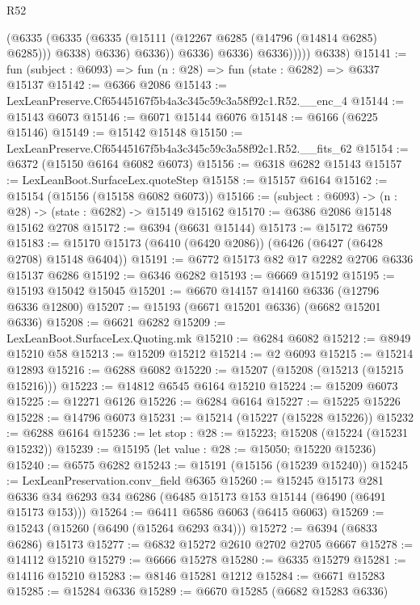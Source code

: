 \begin{lexlean}{R52}
\begin{coremodule}
                      (@6335
                        (@6335
                          (@6335 (@15111 (@12267 @6285 (@14796 (@14814 @6285) @6285))) @6338)
                          @6336)
                        @6336))
                    @6336)
                  @6336)
                @6336)))))
      @6338)
@15141 := fun (subject : @6093) => fun (n : @28) => fun (state : @6282) => @6337 @15137
@15142 := @6366 @2086
@15143 := LexLeanPreserve.Cf65445167f5b4a3c345c59c3a58f92c1.R52.__enc_4
@15144 := @15143 @6073
@15146 := @6071 @15144 @6076
@15148 := @6166 (@6225 @15146)
@15149 := @15142 @15148
@15150 := LexLeanPreserve.Cf65445167f5b4a3c345c59c3a58f92c1.R52.__fits_62
@15154 := @6372 (@15150 @6164 @6082 @6073)
@15156 := @6318 @6282 @15143
@15157 := LexLeanBoot.SurfaceLex.quoteStep
@15158 := @15157 @6164
@15162 := @15154 (@15156 (@15158 @6082 @6073))
@15166 := (subject : @6093) -> (n : @28) -> (state : @6282) -> @15149 @15162
@15170 := @6386 @2086 @15148 @15162 @2708
@15172 := @6394 (@6631 @15144)
@15173 := @15172 @6759
@15183 := @15170 @15173 (@6410 (@6420 @2086)) (@6426 (@6427 (@6428 @2708) @15148 @6404))
@15191 := @6772 @15173 @82 @17 @2282 @2706 @6336 @15137 @6286
@15192 := @6346 @6282
@15193 := @6669 @15192
@15195 := @15193 @15042 @15045
@15201 := @6670 @14157 @14160 @6336 (@12796 @6336 @12800)
@15207 := @15193 (@6671 @15201 @6336) (@6682 @15201 @6336)
@15208 := @6621 @6282
@15209 := LexLeanBoot.SurfaceLex.Quoting.mk
@15210 := @6284 @6082
@15212 := @8949 @15210 @58
@15213 := @15209 @15212
@15214 := @2 @6093
@15215 := @15214 @12893
@15216 := @6288 @6082
@15220 := @15207 (@15208 (@15213 (@15215 @15216)))
@15223 := @14812 @6545 @6164 @15210
@15224 := @15209 @6073
@15225 := @12271 @6126
@15226 := @6284 @6164
@15227 := @15225 @15226
@15228 := @14796 @6073
@15231 := @15214 (@15227 (@15228 @15226))
@15232 := @6288 @6164
@15236 := let stop : @28 := @15223; @15208 (@15224 (@15231 @15232))
@15239 := @15195 (let value : @28 := @15050; @15220 @15236)
@15240 := @6575 @6282
@15243 := @15191 (@15156 (@15239 @15240))
@15245 := LexLeanPreservation.conv_field @6365
@15260 := @15245
    @15173
    @281
    @6336
    @34
    @6293
    @34
    @6286
    (@6485 @15173 @153 @15144 (@6490 (@6491 @15173 @153)))
@15264 := @6411 @6586 @6063 (@6415 @6063)
@15269 := @15243 (@15260 (@6490 (@15264 @6293 @34)))
@15272 := @6394 (@6833 @6286) @15173
@15277 := @6832 @15272 @2610 @2702 @2705 @6667
@15278 := @14112 @15210
@15279 := @6666 @15278
@15280 := @6335 @15279
@15281 := @14116 @15210
@15283 := @8146 @15281 @1212
@15284 := @6671 @15283
@15285 := @15284 @6336
@15289 := @6670 @15285 (@6682 @15283 @6336)

\end{coremodule}
\end{lexlean}
